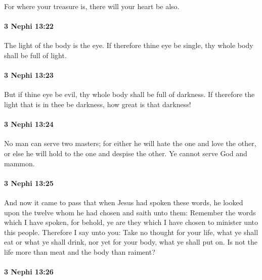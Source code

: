 			For where your treasure is, there will your heart be also.

		\paragraph{3 Nephi 13:22} %
			\label{3NEPHI-13-22}

			The light of the body is the eye.
			If therefore thine eye be single,
			thy whole body shall be full of light.

		\paragraph{3 Nephi 13:23} %
			\label{3NEPHI-13-23}

			But if thine eye be evil,
			thy whole body shall be full of darkness.
			If therefore the light that is in thee be darkness,
			how great is that darkness!

		\paragraph{3 Nephi 13:24} %
			\label{3NEPHI-13-24}

			No man can serve two masters;
			for either he will hate the one and love the other,
			or else he will hold to the one and despise the other.
			Ye cannot serve God and mammon.

		\paragraph{3 Nephi 13:25} %
			\label{3NEPHI-13-25}

			And now it came to pass that when Jesus had spoken these words,
			he looked upon the twelve whom he had chosen and saith unto them:
			Remember the words which I have spoken,
			for behold, ye are they which I have chosen to minister unto this people.
			Therefore I say unto you:
			Take no thought for your life,
			what ye shall eat or what ye shall drink,
			nor yet for your body, what ye shall put on.
			Is not the life more than meat and the body than raiment?

		\paragraph{3 Nephi 13:26} %
			\label{3NEPHI-13-26}

